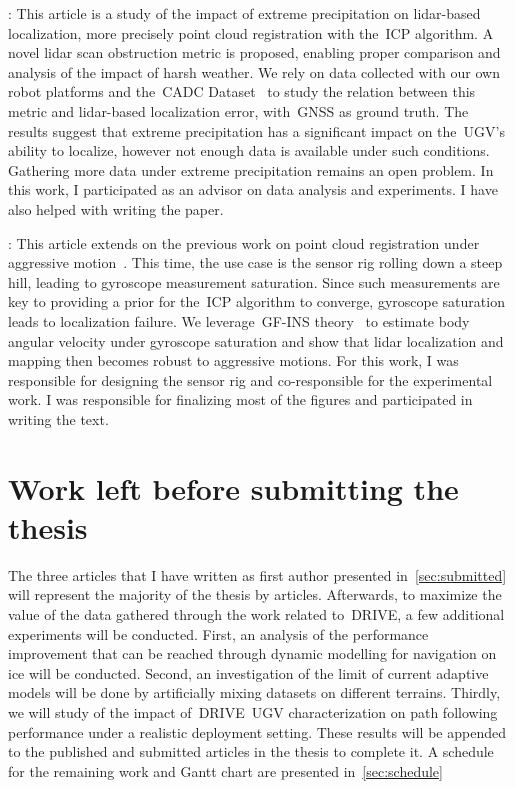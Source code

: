 \documentclass[12pt,letterpaper,oneside]{article}
\begin{document}
\textbf{}:
This article is a study of the impact of extreme precipitation on lidar-based localization, more precisely point cloud registration with the~\ac{ICP} algorithm.
A novel lidar scan obstruction metric is proposed, enabling proper comparison and analysis of the impact of harsh weather.
We rely on data collected with our own robot platforms and the~\ac{CADC} Dataset~\citep{Pitropov2021} to study the relation between this metric and lidar-based localization error, with~\ac{GNSS} as ground truth.
The results suggest that extreme precipitation has a significant impact on the~\ac{UGV}'s ability to localize, however not enough data is available under such conditions.
Gathering more data under extreme precipitation remains an open problem.
In this work, I participated as an advisor on data analysis and experiments.
I have also helped with writing the paper.

\textbf{}:
This article extends on the previous work on point cloud registration under aggressive motion~\citep{Deschenes2021}.
This time, the use case is the sensor rig rolling down a steep hill, leading to gyroscope measurement saturation.
Since such measurements are key to providing a prior for the~\ac{ICP} algorithm to converge, gyroscope saturation leads to localization failure.
We leverage~\ac{GF}-\ac{INS} theory~\citep{Pachter2013} to estimate body angular velocity under gyroscope saturation and show that lidar localization and mapping then becomes robust to aggressive motions.
For this work, I was responsible for designing the sensor rig and co-responsible for the experimental work.
I was responsible for finalizing most of the figures and participated in writing the text.

\section{Work left before submitting the thesis}
\label{sec:future_work}

The three articles that I have written as first author presented in~\autoref{sec:submitted} will represent the majority of the thesis by articles.
Afterwards, to maximize the value of the data gathered through the work related to~\ac{DRIVE}, a few additional experiments will be conducted.
First, an analysis of the performance improvement that can be reached through dynamic modelling for navigation on ice will be conducted.
Second, an investigation of the limit of current adaptive models will be done by artificially mixing datasets on different terrains.
Thirdly, we will study of the impact of~\ac{DRIVE}~\ac{UGV} characterization on path following performance under a realistic deployment setting.
These results will be appended to the published and submitted articles in the thesis to complete it.
A schedule for the remaining work and Gantt chart are presented in~\autoref{sec:schedule}
\end{document}
